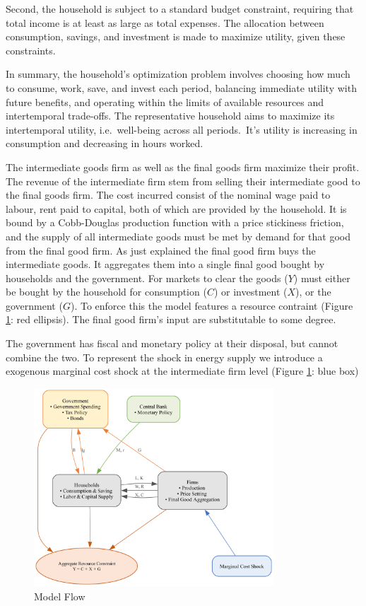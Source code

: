 \documentclass[12pt]{article}
\begin{document}
Second, the household is subject to a standard budget constraint, requiring that total income is at least as large as total expenses. The allocation between consumption, savings, and investment is made to maximize utility, given these constraints.

In summary, the household's optimization problem involves choosing how much to consume, work, save, and invest each period, balancing immediate utility with future benefits, and operating within the limits of available resources and intertemporal trade-offs.
The representative household aims to maximize its intertemporal utility, i.e.~well-being across all periods.\ It's utility is increasing in consumption and decreasing in hours worked. 

The intermediate goods firm as well as the final goods firm maximize their profit. The revenue of the intermediate firm stem from selling their intermediate good to the final goods firm. The cost incurred consist of the nominal wage paid to labour, rent paid to capital, both of which are provided by the household. It is bound by a Cobb-Douglas production function with a price stickiness friction, and the supply of all intermediate goods must be met by demand for that good from the final good firm.  As just explained the final good firm buys the intermediate goods. It aggregates them into a single final good bought by households and the government. For markets to clear the goods ($Y$) must either be bought by the household for consumption ($C$) or investment ($X$), or the government ($G$). To enforce this the model features a resource contraint (Figure \ref{fig:model_flow}: red ellipsis). The final good firm's input are substitutable to some degree. 

The government has fiscal and monetary policy at their disposal, but cannot combine the two. To represent the shock in energy supply we introduce a exogenous marginal cost shock at the intermediate firm level (Figure \ref{fig:model_flow}: blue box)


\begin{figure}[!h]
    \caption{Model Flow}\label{fig:model_flow}
    \centering
    \includegraphics[width=0.8\textwidth]{../../model_graph.png}
\end{figure}
\end{document}
